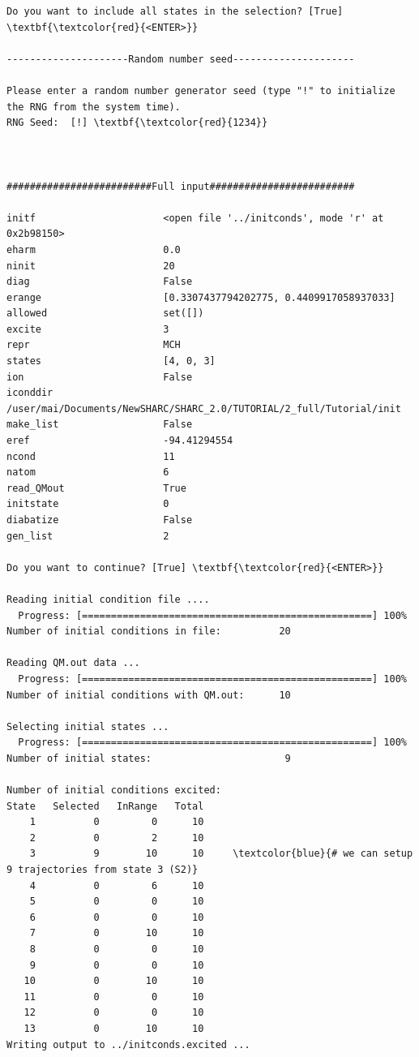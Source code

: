 \documentclass[a4paper,11pt,DIV=15,openany]{scrbook}
\begin{document}
\begin{oframed}
\begin{Verbatim}[commandchars=\\\{\}]
Do you want to include all states in the selection? [True] \textbf{\textcolor{red}{<ENTER>}}

---------------------Random number seed---------------------

Please enter a random number generator seed (type "!" to initialize the RNG from the system time).
RNG Seed:  [!] \textbf{\textcolor{red}{1234}}



#########################Full input#########################

initf                      <open file '../initconds', mode 'r' at 0x2b98150>
eharm                      0.0
ninit                      20
diag                       False
erange                     [0.3307437794202775, 0.4409917058937033]
allowed                    set([])
excite                     3
repr                       MCH
states                     [4, 0, 3]
ion                        False
iconddir                   /user/mai/Documents/NewSHARC/SHARC_2.0/TUTORIAL/2_full/Tutorial/init
make_list                  False
eref                       -94.41294554
ncond                      11
natom                      6
read_QMout                 True
initstate                  0
diabatize                  False
gen_list                   2

Do you want to continue? [True] \textbf{\textcolor{red}{<ENTER>}}

Reading initial condition file ....
  Progress: [==================================================] 100%
Number of initial conditions in file:          20

Reading QM.out data ...
  Progress: [==================================================] 100%
Number of initial conditions with QM.out:      10

Selecting initial states ...
  Progress: [==================================================] 100%
Number of initial states:                       9

Number of initial conditions excited:
State   Selected   InRange   Total
    1          0         0      10
    2          0         2      10
    3          9        10      10     \textcolor{blue}{# we can setup 9 trajectories from state 3 (S2)}
    4          0         6      10
    5          0         0      10
    6          0         0      10
    7          0        10      10
    8          0         0      10
    9          0         0      10
   10          0        10      10
   11          0         0      10
   12          0         0      10
   13          0        10      10
Writing output to ../initconds.excited ...
\end{Verbatim}
\end{oframed}
\end{document}
